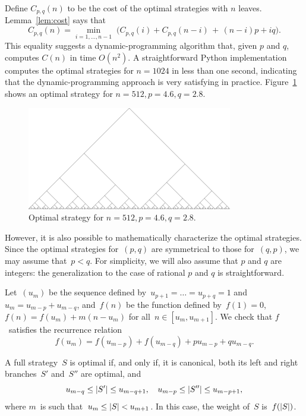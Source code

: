 Define $C_{p,q}(n)$ to be the cost of the optimal strategies with $n$
leaves. Lemma~\ref{lem:cost} says that
\begin{equation}
  C_{p,q}(n) = \min_{i = 1, \dots, n-1} \;
    \bigl(C_{p,q}(i) + C_{p,q}(n-i) \,+ \,(n-i)p + iq\bigr).
\end{equation}
This equality suggests a dynamic-programming algorithm that, given $p$
and $q$, computes $C(n)$ in time $O(n^2)$. A straightforward Python
implementation computes the optimal strategies for $n=1024$ in less
than one second, indicating that the dynamic-programming approach is
very satisfying in practice. Figure~\ref{fig:optimal} shows an
optimal strategy for $n=512,p=4.6,q=2.8$.

\begin{figure}[t]
  \centering
  \includegraphics[width=0.8\textwidth]{sidh/optimal.png}
  \caption{Optimal strategy for $n=512,p=4.6,q=2.8$.}
  \label{fig:optimal}
\end{figure}

However, it is also possible to mathematically characterize the
optimal strategies. Since the optimal strategies for~$(p,q)$ are
symmetrical to those for~$(q,p)$, we may assume that~$p < q$. For
simplicity, we will also assume that $p$ and $q$ are integers: the
generalization to the case of rational $p$ and $q$ is
straightforward.

Let~$(u_m)$ be the sequence defined by~$u_{p+1} =
\dots = u_{p+q} = 1$ and~$u_m = u_{m-p} + u_{m-q}$, and~$f(n)$ be the
function defined by~$f(1) = 0$, $f(n) = f(u_{m}) + m(n - u_m)$
for all~$n \in [u_{m}, u_{m+1}]$. We check that $f$~satisfies the
recurrence relation
\begin{equation}\label{eq:recurrence-f}
f(u_m) = f(u_{m-p}) + f(u_{m-q}) + p u_{m-p} + q u_{m-q}.
\end{equation}

\begin{proposition}\label{prop:optimal-strategy}
A full strategy~$S$ is optimal if, and only if, it is canonical, both its left
and right branches~$S'$ and~$S''$ are optimal, and
\[ u_{m-q} \leq \left|S'\right| \leq u_{m-q+1}, \quad
  u_{m-p} \leq \left|S''\right| \leq u_{m-p+1}, \]
where $m$~is such that~$u_{m} \leq \left|S\right| < u_{m+1}$. In this case, the
weight of~$S$ is~$f(\left|S\right|)$.
\end{proposition}


